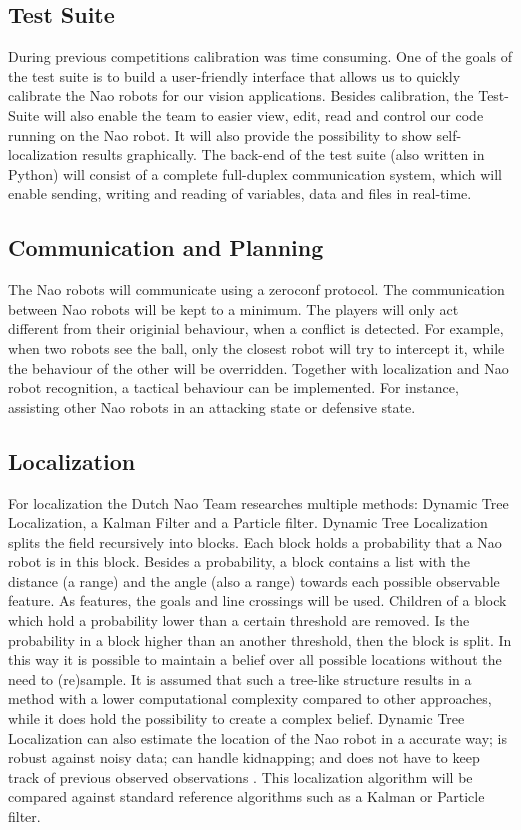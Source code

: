 \documentclass[11pt]{article}
\begin{document}
\subsection{Test Suite}
During previous competitions calibration was time consuming. One of the goals of the test suite is to build a user-friendly interface that allows us to quickly calibrate the Nao robots for our vision applications. Besides calibration, the Test-Suite will also enable the team to easier view, edit, read and control our code running on the Nao robot. It will also provide the possibility to show self-localization results graphically.
The back-end of the test suite (also written in Python) will consist of a complete full-duplex communication system, which will enable sending, writing and reading of variables, data and files in real-time.
\subsection{Communication and Planning}
The Nao robots will communicate using a zeroconf protocol. The  communication between Nao robots will be kept to a minimum. The players will only act different from their originial behaviour, when a conflict is detected. For example, when two robots see the ball, only the closest robot will try to intercept it, while the behaviour of the other will be overridden. Together with localization and Nao robot recognition, a tactical behaviour can be implemented. For instance, assisting other Nao robots in an attacking state or defensive state.
\subsection{Localization}
For localization the Dutch Nao Team researches multiple methods: Dynamic Tree Localization, a Kalman Filter and a Particle filter. 
Dynamic Tree Localization \cite{vdMolen2011} splits the field recursively into blocks. Each block holds a probability that a Nao robot is in this block. 
Besides a probability, a block contains a list with the distance (a range) and the angle (also a range) towards each possible observable feature. 
As features, the goals and line crossings will be used. Children of a block which hold a probability lower than a certain threshold are removed.
Is the probability in a block higher than an another threshold, then the block is split. In this way it is possible to maintain a belief over all possible locations without the need to (re)sample.
It is assumed that such a tree-like structure results in a method with a lower computational complexity compared to other approaches, while it does hold the possibility to create a complex belief. 
Dynamic Tree Localization can also estimate the location of the Nao robot in a accurate way; is robust against noisy data; can handle kidnapping; and does not have to keep track of previous observed observations \cite{vdMolen2011}.
This localization algorithm will be compared against standard reference algorithms such as a Kalman or Particle filter. 
\end{document}
